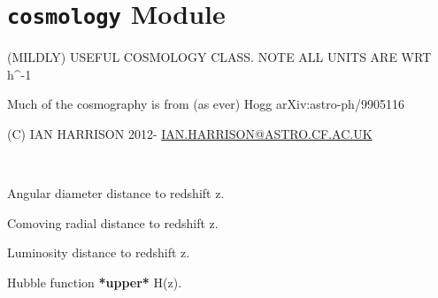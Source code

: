 \documentclass[letterpaper,10pt,english]{sphinxmanual}
\begin{document}
\section{\texttt{cosmology} Module}
\label{PyCosmo:module-PyCosmo.cosmology}\label{PyCosmo:cosmology-module}
(MILDLY) USEFUL COSMOLOGY CLASS.
NOTE ALL UNITS ARE WRT h\textasciicircum{}-1

Much of the cosmography is from (as ever) Hogg arXiv:astro-ph/9905116

(C) IAN HARRISON
2012-
\href{mailto:IAN.HARRISON@ASTRO.CF.AC.UK}{IAN.HARRISON@ASTRO.CF.AC.UK}

\begin{fulllineitems}
\label{PyCosmo:PyCosmo.cosmology.Cosmology}~

\begin{fulllineitems}
\label{PyCosmo:PyCosmo.cosmology.Cosmology.D_a}
Angular diameter distance to redshift z.

\end{fulllineitems}


\begin{fulllineitems}
\label{PyCosmo:PyCosmo.cosmology.Cosmology.D_c}
Comoving radial distance to redshift z.

\end{fulllineitems}


\begin{fulllineitems}
\label{PyCosmo:PyCosmo.cosmology.Cosmology.D_l}
Luminosity distance to redshift z.

\end{fulllineitems}


\begin{fulllineitems}
\label{PyCosmo:PyCosmo.cosmology.Cosmology.H}
Hubble function \textbf{*upper*} H(z).


\end{fulllineitems}
\end{fulllineitems}
\end{document}
